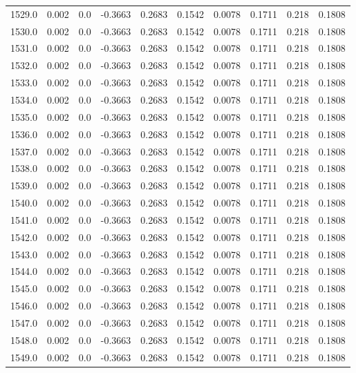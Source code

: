 \begin{longtable}{lrrrrrrrrr}
1529.0 & 0.002 & 0.0 & -0.3663 & 0.2683 & 0.1542 & 0.0078 & 0.1711 & 0.218 & 0.1808 \\
1530.0 & 0.002 & 0.0 & -0.3663 & 0.2683 & 0.1542 & 0.0078 & 0.1711 & 0.218 & 0.1808 \\
1531.0 & 0.002 & 0.0 & -0.3663 & 0.2683 & 0.1542 & 0.0078 & 0.1711 & 0.218 & 0.1808 \\
1532.0 & 0.002 & 0.0 & -0.3663 & 0.2683 & 0.1542 & 0.0078 & 0.1711 & 0.218 & 0.1808 \\
1533.0 & 0.002 & 0.0 & -0.3663 & 0.2683 & 0.1542 & 0.0078 & 0.1711 & 0.218 & 0.1808 \\
1534.0 & 0.002 & 0.0 & -0.3663 & 0.2683 & 0.1542 & 0.0078 & 0.1711 & 0.218 & 0.1808 \\
1535.0 & 0.002 & 0.0 & -0.3663 & 0.2683 & 0.1542 & 0.0078 & 0.1711 & 0.218 & 0.1808 \\
1536.0 & 0.002 & 0.0 & -0.3663 & 0.2683 & 0.1542 & 0.0078 & 0.1711 & 0.218 & 0.1808 \\
1537.0 & 0.002 & 0.0 & -0.3663 & 0.2683 & 0.1542 & 0.0078 & 0.1711 & 0.218 & 0.1808 \\
1538.0 & 0.002 & 0.0 & -0.3663 & 0.2683 & 0.1542 & 0.0078 & 0.1711 & 0.218 & 0.1808 \\
1539.0 & 0.002 & 0.0 & -0.3663 & 0.2683 & 0.1542 & 0.0078 & 0.1711 & 0.218 & 0.1808 \\
1540.0 & 0.002 & 0.0 & -0.3663 & 0.2683 & 0.1542 & 0.0078 & 0.1711 & 0.218 & 0.1808 \\
1541.0 & 0.002 & 0.0 & -0.3663 & 0.2683 & 0.1542 & 0.0078 & 0.1711 & 0.218 & 0.1808 \\
1542.0 & 0.002 & 0.0 & -0.3663 & 0.2683 & 0.1542 & 0.0078 & 0.1711 & 0.218 & 0.1808 \\
1543.0 & 0.002 & 0.0 & -0.3663 & 0.2683 & 0.1542 & 0.0078 & 0.1711 & 0.218 & 0.1808 \\
1544.0 & 0.002 & 0.0 & -0.3663 & 0.2683 & 0.1542 & 0.0078 & 0.1711 & 0.218 & 0.1808 \\
1545.0 & 0.002 & 0.0 & -0.3663 & 0.2683 & 0.1542 & 0.0078 & 0.1711 & 0.218 & 0.1808 \\
1546.0 & 0.002 & 0.0 & -0.3663 & 0.2683 & 0.1542 & 0.0078 & 0.1711 & 0.218 & 0.1808 \\
1547.0 & 0.002 & 0.0 & -0.3663 & 0.2683 & 0.1542 & 0.0078 & 0.1711 & 0.218 & 0.1808 \\
1548.0 & 0.002 & 0.0 & -0.3663 & 0.2683 & 0.1542 & 0.0078 & 0.1711 & 0.218 & 0.1808 \\
1549.0 & 0.002 & 0.0 & -0.3663 & 0.2683 & 0.1542 & 0.0078 & 0.1711 & 0.218 & 0.1808 \\

\end{longtable}
